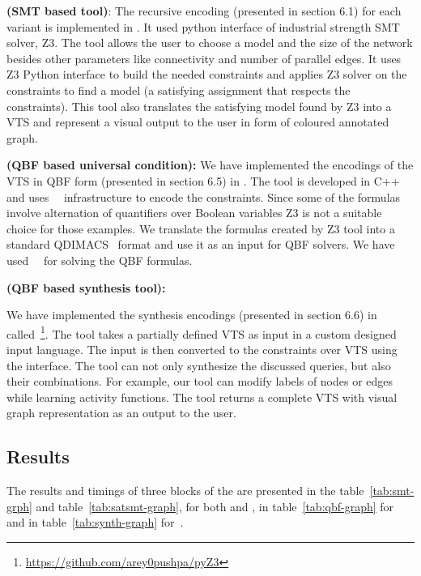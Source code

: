 \textbf{{\smttool} (SMT based tool)}:
The recursive encoding (presented in section 6.1)  
for each variant is implemented in {\smttool}.
%
It used python interface of industrial strength SMT solver, Z3. 
%
The tool allows the user to choose a model and the size
of the network besides other parameters like connectivity and number of parallel edges. 
%		
It uses Z3 Python interface to build the needed constraints and applies Z3 solver on the constraints to find a model (a satisfying assignment that respects the constraints). 
%
This tool also translates the satisfying model found by Z3 into
a VTS and represent a visual output to the user in form of coloured annotated graph. 
%
%
 

\textbf{{\qbftool} (QBF based universal condition):}
We have implemented the encodings of the VTS in QBF form (presented in section 6.5) in
{\qbftool}. 
%
The tool is developed in C++ and uses~\zthree~\cite{z3} infrastructure to encode the constraints.
%
Since some of the formulas involve alternation of quantifiers over Boolean variables Z3 is not a suitable choice for those examples.
%
We translate the formulas created by Z3 tool into a standard
QDIMACS~\cite{qdimacs} format and use it as an input for QBF solvers. 
%
We have used~\depqbf~\cite{lonsing2010depqbf} for solving the QBF formulas. 

\textbf{{\ourtool} (QBF based synthesis tool):}

We have implemented the synthesis encodings (presented in section 6.6) in
called~\ourtool\footnote{{\url{https://github.com/arey0pushpa/pyZ3}}}.
%
The tool takes a partially defined VTS as input in a custom designed
input language.
%
The input is then converted to the constraints over VTS using the {\qbftool} interface. 
%
The tool can not only synthesize the discussed queries, but also their
combinations.
%
For example, our tool can modify labels of nodes or edges while
learning activity functions.
%
The tool returns a complete VTS with visual graph representation as an output to the user.  

\subsection{Results}
The results and timings of three blocks of the {\vtstool} are presented in the table~\ref{tab:smt-grph} and table~\ref{tab:satsmt-graph}, for both {\sattool} and {\smttool}, in table~\ref{tab:qbf-graph} for {\sattool} and in table~\ref{tab:synth-graph} for~{\ourtool}.


